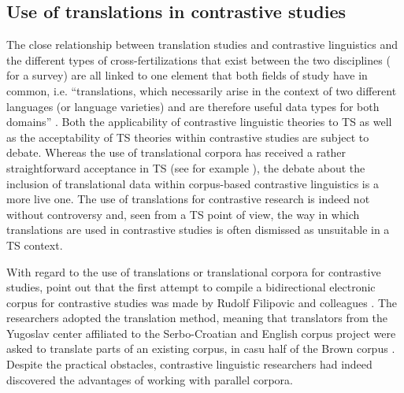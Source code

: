 \subsection{Use of translations in contrastive studies}
\label{sec:2.3.1}  
The close relationship between translation studies and contrastive linguistics and the different types of cross-fertilizations that exist between the two disciplines  (\citealt{gambier_contrastive_2013} for a survey) are all linked to one element that both fields of study have in common, i.e. “translations, which necessarily arise in the context of two different languages (or language varieties) and are therefore useful data types for both domains” \citep[36]{gambier_contrastive_2013}. Both the applicability of contrastive linguistic theories to TS as well as the acceptability of TS theories within contrastive studies are subject to debate. Whereas the use of translational corpora has received a rather straightforward acceptance in TS (see for example \citealt{wollin_translationese_1986, aijmer_translations_1996,laviosa_corpus-based_2002}), the debate about the inclusion of translational data within corpus-based contrastive linguistics is a more live one. The use of translations for contrastive research is indeed not without controversy and, seen from a TS point of view, the way in which translations are used in contrastive studies is often dismissed as unsuitable in a TS context.

With regard to the use of translations or translational corpora for contrastive studies, \citet[40]{altenberg_recent_2002} point out that the first attempt to compile a bidirectional electronic corpus for contrastive studies was made by Rudolf Filipovic and colleagues \citep{filipovic_choice_1969}. The researchers adopted the translation method, meaning that translators from the Yugoslav center affiliated to the Serbo-Croatian and English corpus project were asked to translate parts of an existing corpus, in casu half of the Brown corpus \citep[38--43]{filipovic_choice_1969}. Despite the practical obstacles, contrastive linguistic researchers had indeed discovered the advantages of working with parallel corpora.

